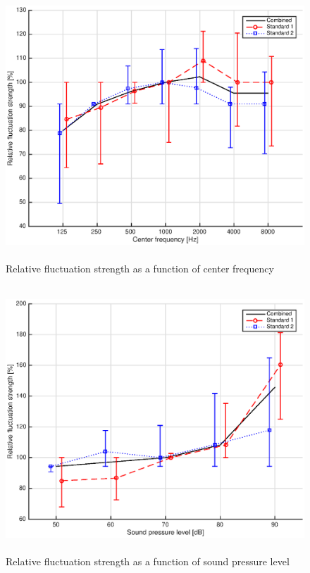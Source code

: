 \documentclass[a4paper]{article}
\begin{document}
\begin{figure}[ht!]
  \centering
  \includegraphics[height=10cm]{img/AM-fc-All-standards.eps}
  \caption{Relative fluctuation strength as a function of center frequency}
\label{fig:fc-all}
\end{figure}

\begin{figure}[ht!]
  \centering
  \includegraphics[height=10cm]{img/AM-SPL-All-standards.eps}
  \caption{Relative fluctuation strength as a function of sound pressure level}
\label{fig:SPL-all}
\end{figure}
\end{document}

